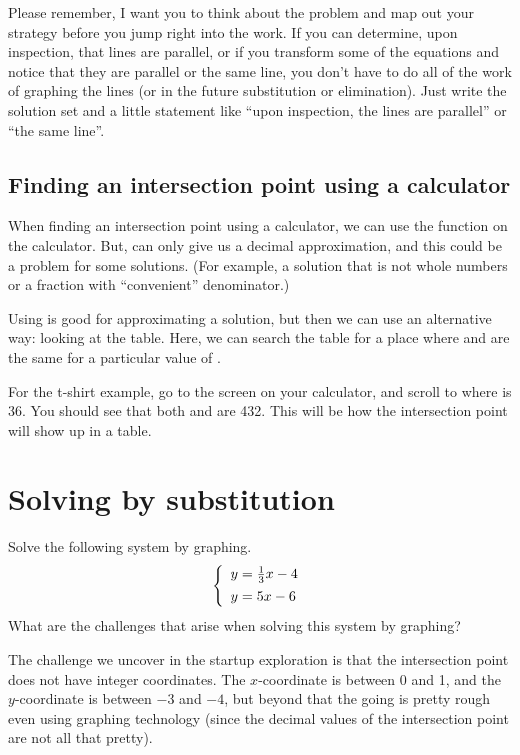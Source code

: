 Please remember, I want you to think about the problem and map out your strategy before you jump right into the work. If you can determine, upon inspection, that lines are parallel, or if you transform some of the equations and notice that they are parallel or the same line, you don't have to do all of the work of graphing the lines (or in the future substitution or elimination). Just write the solution set and a little statement like ``upon inspection, the lines are parallel'' or ``the same line''.


\subsection{Finding an intersection point using a calculator}

When finding an intersection point using a calculator, we can use the  function on the calculator. But,  can only give us a decimal approximation, and this could be a problem for some solutions. (For example, a solution that is not whole numbers or a fraction with ``convenient'' denominator.)

Using  is good for approximating a solution, but then we can use an alternative way: looking at the table. Here, we can search the table for a place where  and  are the same for a particular value of .

For the t-shirt example, go to the  screen on your calculator, and scroll to where  is 36. You should see that both  and  are 432. This will be how the intersection point will show up in a table.


\section{Solving by substitution}
\label{sec:syssubstitution}

\begin{boxedexplore}
Solve the following system by graphing.
\[\twosystem{y=\frac{1}{3}x-4}{y=5x-6}\]
What are the challenges that arise when solving this system by graphing?
\end{boxedexplore}

The challenge we uncover in the startup exploration is that the intersection point does not have integer coordinates. The $x$-coordinate is between 0 and 1, and the $y$-coordinate is between $-3$ and $-4$, but beyond that the going is pretty rough even using graphing technology (since the decimal values of the intersection point are not all that pretty).

